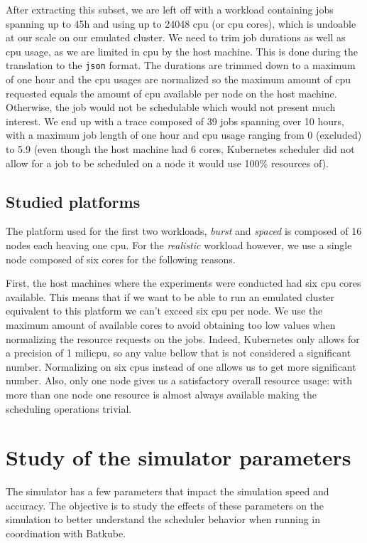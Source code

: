 After extracting this subset, we are left off with a workload containing jobs
spanning up to 45h and using up to 24048 cpu (or cpu cores), which is undoable
at our scale on our emulated cluster. We need to trim job durations as well as
cpu usage, as we are limited in cpu by the host machine. This is done during
the translation to the \texttt{json} format. The durations are trimmed down to
a maximum of one hour and the cpu usages are normalized so the maximum amount
of cpu requested equals the amount of cpu available per node on the host
machine. Otherwise, the job would not be schedulable which would not present
much interest. We end up with a trace composed of 39 jobs spanning over 10
hours, with a maximum job length of one hour and cpu usage ranging from 0
(excluded) to 5.9 (even though the host machine had 6 cores, Kubernetes
scheduler did not allow for a job to be scheduled on a node it would use 100\%
resources of).

\subsection{Studied platforms}

The platform used for the first two workloads, \textit{burst} and
\textit{spaced} is composed of 16 nodes each heaving one cpu. For the
\textit{realistic} workload however, we use a single node composed of six cores
for the following reasons.

First, the host machines where the experiments were conducted had six cpu cores
available. This means that if we want to be able to run an emulated cluster
equivalent to this platform we can't exceed six cpu per node.  We use the
maximum amount of available cores to avoid obtaining too low values
when normalizing the resource requests on the jobs. Indeed, Kubernetes only
allows for a precision of 1 milicpu, so any value bellow that is not considered
a significant number. Normalizing on six cpus instead of one allows us to get
more significant number. Also, only one node gives us a satisfactory overall
resource usage: with more than one node one resource is almost always available
making the scheduling operations trivial.


\section{Study of the simulator parameters} \label{sec:params-eval}

The simulator has a few parameters that impact the simulation speed and
accuracy. The objective is to study the effects of these parameters on the
simulation to better understand the scheduler behavior when running in
coordination with Batkube.\\

